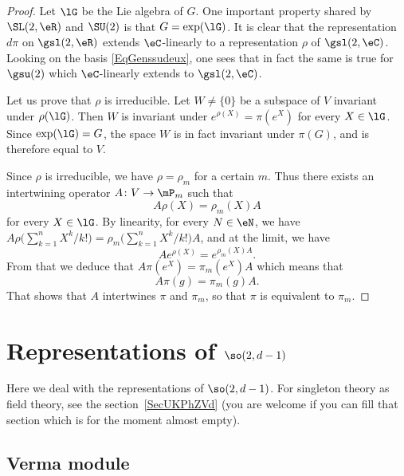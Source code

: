 \begin{proof}
Let $\lG$ be the Lie algebra of $G$. One important property shared by $\SL(2,\eR)$ and $\SU(2)$ is that $G=\exp(\lG)$. It is clear that the representation $d\pi$ on $\gsl(2,\eR)$ extends $\eC$-linearly to a representation $\rho$ of $\gsl(2,\eC)$. Looking on the basis \eqref{EqGenssudeux}, one sees that in fact the same is true for $\gsu(2)$ which $\eC$-linearly extends to $\gsl(2,\eC)$.

Let us prove that $\rho$ is irreducible. Let $W\neq\{ 0 \}$ be a subspace of $V$ invariant under $\rho(\lG)$. Then $W$ is invariant under $ e^{\rho(X)}=\pi( e^{X})$ for every $X\in\lG$. Since $\exp(\lG)=G$, the space $W$ is in fact invariant under $\pi(G)$, and is therefore equal to $V$.

Since $\rho$ is irreducible, we have $\rho=\rho_m$ for a certain $m$. Thus there exists an intertwining operator $A\colon V\to \mP_m$ such that
\[
	A\rho(X)=\rho_m(X)A
\]
for every $X\in\lG$. By linearity, for every $N\in\eN$, we have $A\rho\big( \sum_{k=1}^n X^k/k! \big)=\rho_m\big( \sum_{k=1}^n X^k/k! \big)A$, and at the limit, we have
\begin{equation}
	A e^{\rho(X)}= e^{\rho_m(X)A}.
\end{equation}
From that we deduce that $A\pi( e^{X})=\pi_m( e^{X})A$ which means that
\[
	A\pi(g)=\pi_m(g)A.
\]
That shows that $A$ intertwines $\pi$ and $\pi_m$, so that $\pi$ is equivalent to $\pi_m$.
\end{proof}
\section{Representations of \texorpdfstring{$\so(2,d-1)$}{so2d}}

Here we deal with the representations of \( \so(2,d-1)\). For singleton theory as field theory, see the section~\ref{SecUKPhZVd} (you are welcome if you can fill that section which is for the moment almost empty).

\subsection{Verma module}

